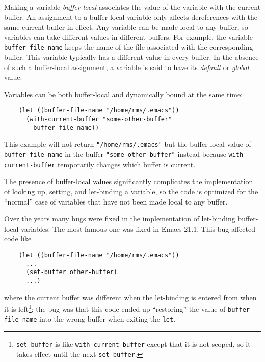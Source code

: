 \documentclass[format=acmsmall, review]{acmart}
\begin{document}
Making a variable \emph{buffer-local} associates the value of the variable
with the current buffer.  An assignment to a buffer-local variable
only affects dereferences with the same current buffer in effect.
Any variable can be made local to any buffer, so variables can take
different values in different buffers.  For example, the variable
\texttt{buffer-file-name} keeps the name of the file associated with the
corresponding buffer.  This variable typically has a different value in
every buffer.  In the absence of such a buffer-local assignment, a variable
is said to have its \emph{default} or \emph{global} value.

Variables can be both buffer-local and dynamically bound at the same time:
\begin{verbatim}
    (let ((buffer-file-name "/home/rms/.emacs"))
      (with-current-buffer "some-other-buffer"
        buffer-file-name))
\end{verbatim}
This example will not return \texttt{"/home/rms/.emacs"} but the
buffer-local value of \texttt{buffer-file-name} in the buffer
\texttt{"some-other-buffer"} instead because \texttt{with-current-buffer}
temporarily changes which buffer is current.

The presence of buffer-local values significantly complicates the
implementation of looking up, setting, and let-binding a variable, so the
code is optimized for the ``normal'' case of variables that have not been
made local to any buffer.

Over the years many bugs were fixed in the implementation of let-binding
buffer-local variables.  The most famous one was fixed in Emacs-21.1.
This bug affected code like
\begin{verbatim}
    (let ((buffer-file-name "/home/rms/.emacs"))
      ...
      (set-buffer other-buffer)
      ...)
\end{verbatim}
where the current buffer was different when the let-binding is entered from
when it is left\footnote{\texttt{set-buffer} is like
  \texttt{with-current-buffer} except that it is not scoped, so it takes
  effect until the next \texttt{set-buffer}.}; the bug was that this code
ended up ``restoring'' the value of \texttt{buffer-file-name} into the
wrong buffer when exiting the \texttt{let}.
\end{document}
